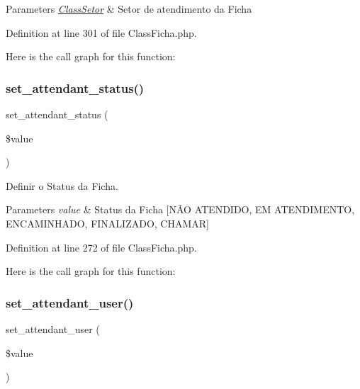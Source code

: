 \begin{DoxyParams}{Parameters}
{\em \hyperlink{class_class_setor}{Class\+Setor}} & Setor de atendimento da Ficha \\
\hline
\end{DoxyParams}


Definition at line 301 of file Class\+Ficha.\+php.

Here is the call graph for this function\+:
\mbox{\label{class_class_ficha_a0d789f7b74b448e59b675b7860f614a4}} 
\subsubsection{\texorpdfstring{set\+\_\+attendant\+\_\+status()}{set\_attendant\_status()}}
{\footnotesize\ttfamily set\+\_\+attendant\+\_\+status (\begin{DoxyParamCaption}\item[{}]{\$value }\end{DoxyParamCaption})}



Definir o Status da Ficha. 


\begin{DoxyParams}{Parameters}
{\em value} & Status da Ficha \mbox{[}NÃO A\+T\+E\+N\+D\+I\+DO, EM A\+T\+E\+N\+D\+I\+M\+E\+N\+TO, E\+N\+C\+A\+M\+I\+N\+H\+A\+DO, F\+I\+N\+A\+L\+I\+Z\+A\+DO, C\+H\+A\+M\+AR\mbox{]} \\
\hline
\end{DoxyParams}


Definition at line 272 of file Class\+Ficha.\+php.

Here is the call graph for this function\+:
\mbox{\label{class_class_ficha_a0aca98dbfbc3b9580208f2ca5690aca3}} 
\subsubsection{\texorpdfstring{set\+\_\+attendant\+\_\+user()}{set\_attendant\_user()}}
{\footnotesize\ttfamily set\+\_\+attendant\+\_\+user (\begin{DoxyParamCaption}\item[{}]{\$value }\end{DoxyParamCaption})}



